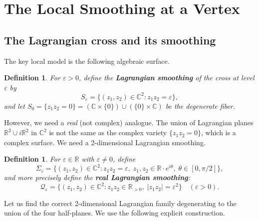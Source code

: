 \documentclass[12pt]{article}
\newtheorem{definition}[theorem]{Definition}
\newcommand{\bR}{\mathbb{R}}
\newcommand{\bC}{\mathbb{C}}
\newcommand{\eps}{\varepsilon}
\begin{document}
\section{The Local Smoothing at a Vertex}
\label{sec:local-smooth}

\subsection{The Lagrangian cross and its smoothing}

The key local model is the following algebraic surface.

\begin{definition}
For $\eps > 0$, define the \textbf{Lagrangian smoothing} of the cross at level $\eps$ by
\[
  S_\eps = \{(z_1, z_2) \in \bC^2 : z_1 z_2 = \eps\},
\]
and let $S_0 = \{z_1 z_2 = 0\} = (\bC \times \{0\}) \cup (\{0\} \times \bC)$ be the degenerate fiber.
\end{definition}

However, we need a \emph{real} (not complex) analogue. The union of Lagrangian planes $\bR^2 \cup i\bR^2$ in $\bC^2$ is not the same as the complex variety $\{z_1 z_2 = 0\}$, which is a complex surface. We need a 2-dimensional Lagrangian smoothing.

\begin{definition}
For $\eps \in \bR$ with $\eps \neq 0$, define
\[
  \Sigma_\eps = \{(z_1, z_2) \in \bC^2 : z_1 z_2 = \eps,\; z_1, z_2 \in \bR \cdot e^{i\theta},\; \theta \in [0, \pi/2]\},
\]
and more precisely define the \textbf{real Lagrangian smoothing}:
\[
  \mathcal{Q}_\eps = \{(z_1, z_2) \in \bC^2 : z_1 z_2 \in \bR_{>0},\; |z_1 z_2| = \eps^2\} \quad (\eps > 0).
\]
\end{definition}

Let us find the correct 2-dimensional Lagrangian family degenerating to the union of the four half-planes. We use the following explicit construction.
\end{document}
